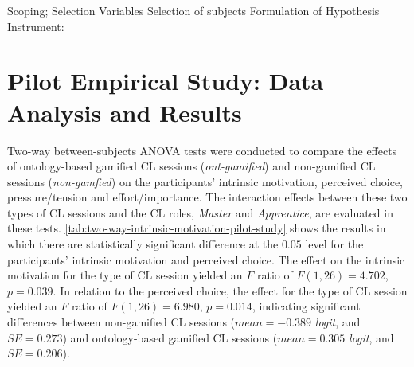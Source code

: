 Scoping;
Selection Variables
Selection of subjects
Formulation of Hypothesis
Instrument:


\section{Pilot Empirical Study: Data Analysis and Results}
\label{sec:data-analysis-pilot-study}

Two-way between-subjects ANOVA tests were conducted to compare the effects of ontology-based gamified CL sessions (\emph{ont-gamified}) and non-gamified CL sessions (\emph{non-gamfied}) on the participants' intrinsic motivation, perceived choice, pressure/tension and effort/importance. The interaction effects between these two types of CL sessions and the CL roles, \emph{Master} and \emph{Apprentice}, are evaluated in these tests. \autoref{tab:two-way-intrinsic-motivation-pilot-study}  shows the results in which there are statistically significant difference at the $0.05$ level for the participants' intrinsic motivation and perceived choice. The effect on the intrinsic motivation for the type of CL session yielded an $F$ ratio of $F(1,26) = 4.702$, $p = 0.039$. In relation to the perceived choice, the effect for the type of CL session yielded an $F$ ratio of $F(1,26) = 6.980$, $p = 0.014$, indicating significant differences between non-gamified CL sessions ($mean = -0.389$ \emph{logit}, and $SE = 0.273$) and ontology-based gamified CL sessions ($mean = 0.305$ \emph{logit}, and $SE = 0.206$).

